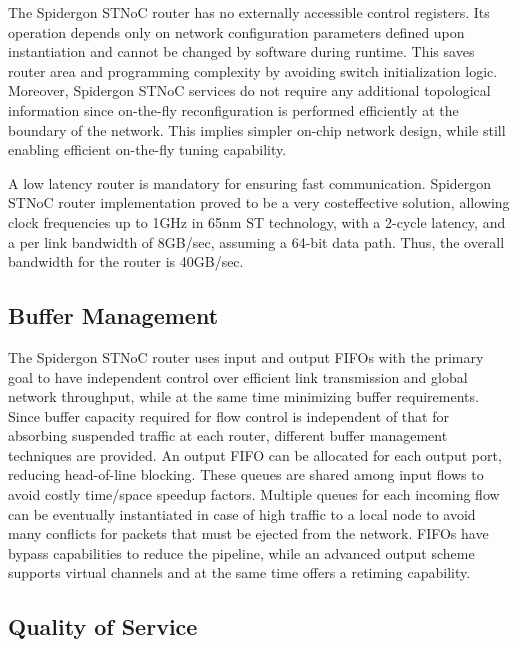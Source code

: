 The Spidergon STNoC router has no externally accessible control registers. 
Its operation depends only on network configuration parameters defined upon instantiation and cannot be changed by software during runtime. 
This saves router area and programming complexity by avoiding switch initialization logic. 
Moreover, Spidergon STNoC services do not require any additional topological information since on-the-fly reconfiguration is performed efficiently at the boundary of the network. 
This implies simpler on-chip network design, while still enabling efficient on-the-fly tuning capability.

A low latency router is mandatory for ensuring fast communication. 
Spidergon STNoC router implementation proved to be a very costeffective solution, allowing clock frequencies up to 1GHz in 65nm ST technology, with a 2-cycle latency, and a per link bandwidth of 8GB/sec, assuming a 64-bit data path. Thus, the overall bandwidth for the router is 40GB/sec.~\cite{coppola2008design}

\subsection{Buffer Management}\label{S:buffer}

The Spidergon STNoC router uses input and output FIFOs with the primary goal to have independent control over efficient link transmission and global network throughput, while at the same time minimizing buffer requirements. 
Since buffer capacity required for flow control is independent of that for absorbing suspended traffic at each router, different buffer management techniques are provided. 
An output FIFO can be allocated for each output port, reducing head-of-line blocking. 
These queues are shared among input flows to avoid costly time/space speedup factors. 
Multiple queues for each incoming flow can be eventually instantiated in case of high traffic to a local node to avoid many conflicts for packets that must be ejected from the network. 
FIFOs have bypass capabilities to reduce the pipeline, while an advanced output scheme supports virtual channels and at the same time offers a retiming capability.

\subsection{Quality of Service}\label{S:qos}

